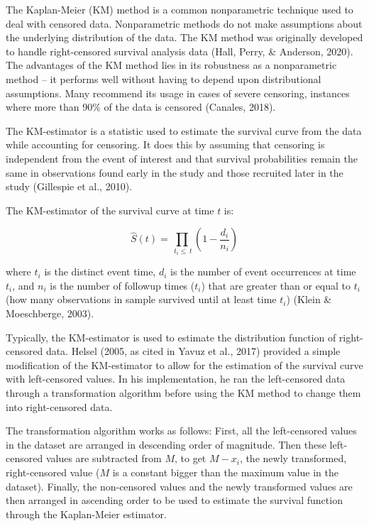 \documentclass[12pt, twoside]{amherstthesis}
\begin{document}
The Kaplan-Meier (KM) method is a common nonparametric technique used to deal with censored data. Nonparametric methods do not make assumptions about the underlying distribution of the data. The KM method was originally developed to handle right-censored survival analysis data (Hall, Perry, \& Anderson, 2020). The advantages of the KM method lies in its robustness as a nonparametric method -- it performs well without having to depend upon distributional assumptions. Many recommend its usage in cases of severe censoring, instances where more than 90\% of the data is censored (Canales, 2018).

The KM-estimator is a statistic used to estimate the survival curve from the data while accounting for censoring. It does this by assuming that censoring is independent from the event of interest and that survival probabilities remain the same in observations found early in the study and those recruited later in the study (Gillespie et al., 2010).

The KM-estimator of the survival curve at time \(t\) is:

\[\hat{S}(t) = \prod_{\ t_i \le \ t }\left(1-\frac{d_i}{n_i}\right)\]

where \(t_i\) is the distinct event time, \(d_i\) is the number of event occurrences at time \(t_i\), and \(n_i\) is the number of followup times (\(t_i\)) that are greater than or equal to \(t_i\) (how many observations in sample survived until at least time \(t_i\)) (Klein \& Moeschberge, 2003).

Typically, the KM-estimator is used to estimate the distribution function of right-censored data. Helsel (2005, as cited in Yavuz et al., 2017) provided a simple modification of the KM-estimator to allow for the estimation of the survival curve with left-censored values. In his implementation, he ran the left-censored data through a transformation algorithm before using the KM method to change them into right-censored data.

The transformation algorithm works as follows: First, all the left-censored values in the dataset are arranged in descending order of magnitude. Then these left-censored values are subtracted from \(M\), to get \(M-x_i\), the newly transformed, right-censored value (\(M\) is a constant bigger than the maximum value in the dataset). Finally, the non-censored values and the newly transformed values are then arranged in ascending order to be used to estimate the survival function through the Kaplan-Meier estimator.
\end{document}
